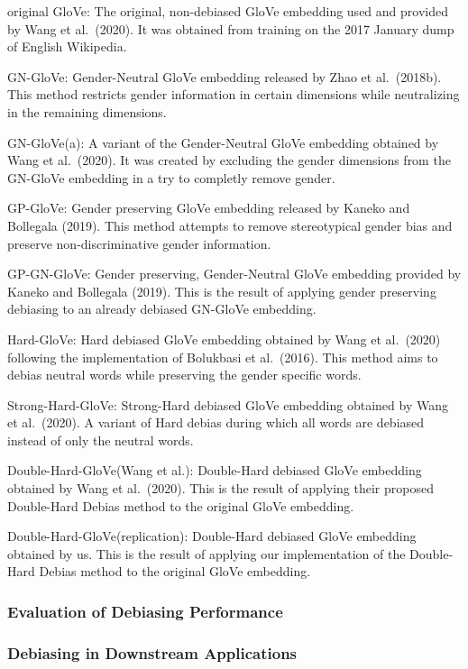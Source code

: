 \documentclass[
  english,
  man,floatsintext]{apa6}
\begin{document}
original GloVe: The original, non-debiased GloVe embedding used and provided by Wang et al.~(2020). It was obtained from training on the 2017 January dump of English Wikipedia.

GN-GloVe: Gender-Neutral GloVe embedding released by Zhao et al.~(2018b). This method restricts gender information in certain dimensions while neutralizing in the remaining dimensions.

GN-GloVe(a): A variant of the Gender-Neutral GloVe embedding obtained by Wang et al.~(2020). It was created by excluding the gender dimensions from the GN-GloVe embedding in a try to completly remove gender.

GP-GloVe: Gender preserving GloVe embedding released by Kaneko and Bollegala (2019). This method attempts to remove stereotypical gender bias and preserve non-discriminative gender information.

GP-GN-GloVe: Gender preserving, Gender-Neutral GloVe embedding provided by Kaneko and Bollegala (2019). This is the result of applying gender preserving debiasing to an already debiased GN-GloVe embedding.

Hard-GloVe: Hard debiased GloVe embedding obtained by Wang et al.~(2020) following the implementation of Bolukbasi et al.~(2016). This method aims to debias neutral words while preserving the gender specific words.

Strong-Hard-GloVe: Strong-Hard debiased GloVe embedding obtained by Wang et al.~(2020). A variant of Hard debias during which all words are debiased instead of only the neutral words.

Double-Hard-GloVe(Wang et al.): Double-Hard debiased GloVe embedding obtained by Wang et al.~(2020). This is the result of applying their proposed Double-Hard Debias method to the original GloVe embedding.

Double-Hard-GloVe(replication): Double-Hard debiased GloVe embedding obtained by us. This is the result of applying our implementation of the Double-Hard Debias method to the original GloVe embedding.

\hypertarget{evaluation-of-debiasing-performance}{%
\subsubsection{Evaluation of Debiasing Performance}\label{evaluation-of-debiasing-performance}}

\hypertarget{debiasing-in-downstream-applications}{%
\subsubsection{Debiasing in Downstream Applications}\label{debiasing-in-downstream-applications}}
\end{document}
